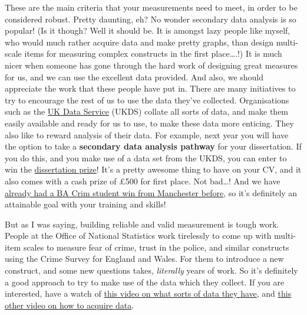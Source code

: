 \documentclass[]{book}
\theoremstyle{definition}
\theoremstyle{definition}
\theoremstyle{definition}
\theoremstyle{remark}
\begin{document}
These are the main criteria that your measurements need to meet, in
order to be considered robust. Pretty daunting, eh? No wonder secondary
data analysis is so popular! (Is it though? Well it should be. It is
amongst lazy people like myself, who would much rather acquire data and
make pretty graphs, than design multi-scale items for measuring complex
constructs in the first place\ldots{}.!) It is much nicer when someone
has gone through the hard work of designing great measures for us, and
we can use the excellent data provided. And also, we should appreciate
the work that these people have put in. There are many initiatives to
try to encourage the rest of us to use the data they've collected.
Organisations such as the \href{https://www.ukdataservice.ac.uk/}{UK
Data Service} (UKDS) collate all sorts of data, and make them easily
available and ready for us to use, to make these data more enticing.
They also like to reward analysis of their data. For example, next year
you will have the option to take a \textbf{secondary data analysis
pathway} for your dissertation. If you do this, and you make use of a
data set from the UKDS, you can enter to win the
\href{https://www.ukdataservice.ac.uk/use-data/student-resources/dissertation-prize}{dissertation
prize}! It's a pretty awesome thing to have on your CV, and it also
comes with a cash prize of £500 for first place. Not bad\ldots{}! And we
have
\href{https://www.ukdataservice.ac.uk/news-and-events/newsitem/?id=4650}{already
had a BA Crim student win from Manchester before}, so it's definitely an
attainable goal with your training and skills!

But as I was saying, building reliable and valid measurement is tough
work. People at the Office of National Statistics work tirelessly to
come up with multi-item scales to measure fear of crime, trust in the
police, and similar constructs using the Crime Survey for England and
Wales. For them to introduce a new construct, and some new questions
takes, \emph{literally} years of work. So it's definitely a good
approach to try to make use of the data which they collect. If you are
interested, have a watch of
\href{https://www.youtube.com/watch?v=cCpHnqn0Q2c\&list=PLG87Imnep1SljSqc0yLIHYBP1w0saMJn-\&index=2}{this
video on what sorts of data they have}, and
\href{https://www.youtube.com/watch?list=PLG87Imnep1SljSqc0yLIHYBP1w0saMJn-\&v=TzRWJK1MtrU}{this
other video on how to acquire data}.
\end{document}

